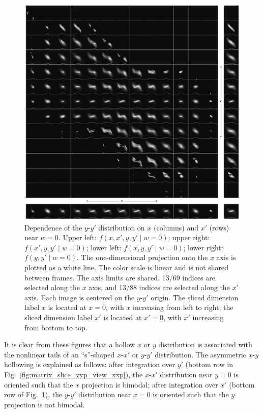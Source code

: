\documentclass[%
 reprint,
nofootinbib,
 amsmath,amssymb,
 aps,
prstab,
]{revtex4-2}
\begin{document}
%
%
\begin{figure}[]
    \centering
    \includegraphics[width=\textwidth]{fig_matrix_slice_x-x'_view_y-y'.pdf}
    \caption{Dependence of the $y$-$y'$ distribution on $x$ (columns) and $x'$ (rows) near $w = 0$. Upper left: $f(x, x', y, y' \mid w{=}0)$; upper right: $f(x', y, y' \mid w{=}0)$; lower left: $f(x, y, y' \mid w{=}0)$; lower right: $f(y, y' \mid w{=}0)$. The one-dimensional projection onto the $x$ axis is plotted as a white line. The color scale is linear and is not shared between frames. The axis limits are shared. 13/69 indices are selected along the $x$ axis, and 13/88 indices are selected along the $x'$ axis. Each image is centered on the $y$-$y'$ origin. The sliced dimension label $x$ is located at $x = 0$, with $x$ increasing from left to right; the sliced dimension label $x'$ is located at $x' = 0$, with $x'$ increasing from bottom to top.}
    \label{fig:matrix_slice_xxp_view_yyp}
\end{figure}
%
It is clear from these figures that a hollow $x$ or $y$ distribution is associated with the nonlinear tails of an ``s''-shaped $x$-$x'$ or $y$-$y'$ distribution. The asymmetric $x$-$y$ hollowing is explained as follows: after integration over $y'$ (bottom row in Fig.~\ref{fig:matrix_slice_yyp_view_xxp}), the $x$-$x'$ distribution near $y = 0$ is oriented such that the $x$ projection is bimodal; after integration over $x'$ (bottom row of Fig.~\ref{fig:matrix_slice_xxp_view_yyp}), the $y$-$y'$ distribution near $x = 0$ is oriented such that the $y$ projection is not bimodal.
\end{document}
